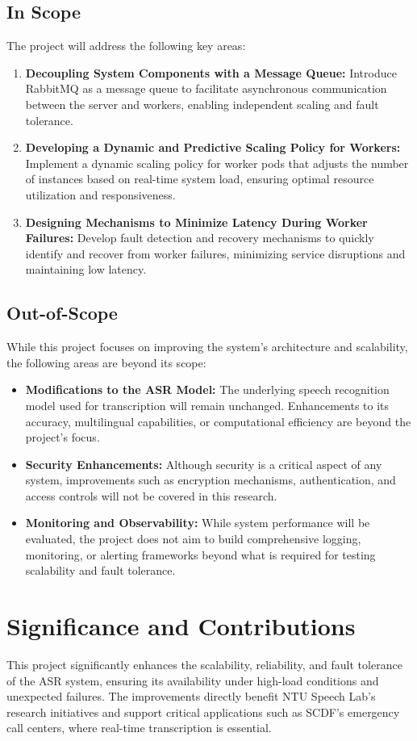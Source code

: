 \subsection{In Scope}
The project will address the following key areas:
\begin{enumerate}
    \item \textbf{Decoupling System Components with a Message Queue: } Introduce RabbitMQ as a message queue to facilitate asynchronous communication between the server and workers, enabling independent scaling and fault tolerance.
    \item \textbf{Developing a Dynamic and Predictive Scaling Policy for Workers: } Implement a dynamic scaling policy for worker pods that adjusts the number of instances based on real-time system load, ensuring optimal resource utilization and responsiveness.
    \item \textbf{Designing Mechanisms to Minimize Latency During Worker Failures: } Develop fault detection and recovery mechanisms to quickly identify and recover from worker failures, minimizing service disruptions and maintaining low latency.
\end{enumerate}

\subsection{Out-of-Scope}
While this project focuses on improving the system’s architecture and scalability, the following areas are beyond its scope:
\begin{itemize}
    \item \textbf{Modifications to the ASR Model:} The underlying speech recognition model used for transcription will remain unchanged. Enhancements to its accuracy, multilingual capabilities, or computational efficiency are beyond the project's focus.
    \item \textbf{Security Enhancements:} Although security is a critical aspect of any system, improvements such as encryption mechanisms, authentication, and access controls will not be covered in this research.
    \item \textbf{Monitoring and Observability:} While system performance will be evaluated, the project does not aim to build comprehensive logging, monitoring, or alerting frameworks beyond what is required for testing scalability and fault tolerance.
\end{itemize}

\section{Significance and Contributions}
This project significantly enhances the scalability, reliability, and fault tolerance of the ASR system, ensuring its availability under high-load conditions and unexpected failures. The improvements directly benefit NTU Speech Lab’s research initiatives and support critical applications such as SCDF’s emergency call centers, where real-time transcription is essential. 

